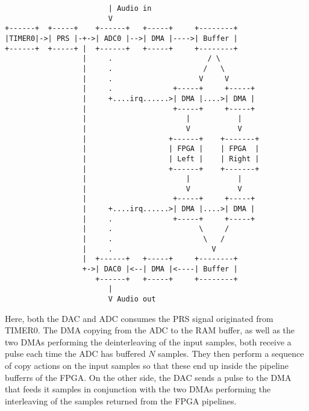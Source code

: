 \begin{verbatim}
                        | Audio in
                        V
+------+  +-----+    +------+   +-----+     +--------+
|TIMER0|->| PRS |-+->| ADC0 |-->| DMA |---->| Buffer |
+------+  +-----+ |  +------+   +-----+     +--------+
                  |     .                      / \
                  |     .                     /   \
                  |     .                    V     V
                  |     .              +-----+     +-----+
                  |     +....irq......>| DMA |....>| DMA |
                  |                    +-----+     +-----+
                  |                       |           |
                  |                       V           V
                  |                   +------+    +-------+
                  |                   | FPGA |    | FPGA  |
                  |                   | Left |    | Right |
                  |                   +------+    +-------+
                  |                       |           |
                  |                       V           V
                  |                    +-----+     +-----+
                  |     +....irq......>| DMA |....>| DMA |
                  |     .              +-----+     +-----+
                  |     .                    \     /
                  |     .                     \   /
                  |     .                       V
                  |  +------+   +-----+     +--------+
                  +->| DAC0 |<--| DMA |<----| Buffer |
                     +------+   +-----+     +--------+
                        |
                        V Audio out
\end{verbatim}

Here, both the DAC and ADC consumes the PRS signal originated from TIMER0. The
DMA copying from the ADC to the RAM buffer, as well as the two DMAs performing the
deinterleaving of the input samples, both receive a pulse each time the ADC has
buffered $N$ samples. They then perform a sequence of copy actions on the input
samples so that these end up inside the pipeline bufferrs of the FPGA. On the
other side, the DAC sends a pulse to the DMA that feeds it samples in conjunction
with the two DMAs performing the interleaving of the samples returned from the
FPGA pipelines.
